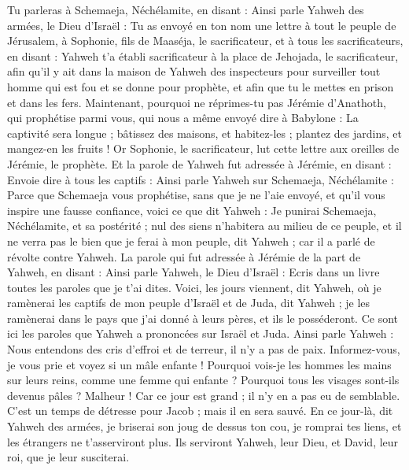 \begin{multicols}{2}
Tu parleras à Schemaeja, Néchélamite, en disant :
Ainsi parle Yahweh des armées, le Dieu d'Israël : Tu as envoyé en ton nom une lettre à tout le peuple de Jérusalem, à Sophonie, fils de Maaséja, le sacrificateur, et à tous les sacrificateurs, en disant :
Yahweh t'a établi sacrificateur à la place de Jehojada, le sacrificateur, afin qu’il y ait dans la maison de Yahweh des inspecteurs pour surveiller tout homme qui est fou et se donne pour prophète, et afin que tu le mettes en prison et dans les fers.
Maintenant, pourquoi ne réprimes-tu pas Jérémie d’Anathoth, qui prophétise parmi vous,
qui nous a même envoyé dire à Babylone : La captivité sera longue ; bâtissez des maisons, et habitez-les ; plantez des jardins, et mangez-en les fruits !
Or Sophonie, le sacrificateur, lut cette lettre aux oreilles de Jérémie, le prophète.
Et la parole de Yahweh fut adressée à Jérémie, en disant :
Envoie dire à tous les captifs : Ainsi parle Yahweh sur Schemaeja, Néchélamite : Parce que Schemaeja vous prophétise, sans que je ne l'aie envoyé, et qu’il vous inspire une fausse confiance,
voici ce que dit Yahweh : Je punirai Schemaeja, Néchélamite, et sa postérité ; nul des siens n’habitera au milieu de ce peuple, et il ne verra pas le bien que je ferai à mon peuple, dit Yahweh ; car il a parlé de révolte contre Yahweh.
\VerseOne{}La parole qui fut adressée à Jérémie de la part de Yahweh, en disant :
Ainsi parle Yahweh, le Dieu d'Israël : Ecris dans un livre toutes les paroles que je t'ai dites.
Voici, les jours viennent, dit Yahweh, où je ramènerai les captifs de mon peuple d'Israël et de Juda, dit Yahweh ; je les ramènerai dans le  pays que j'ai donné à leurs pères, et ils le posséderont.
Ce sont ici les paroles que Yahweh a prononcées sur Israël et Juda.
Ainsi parle Yahweh : Nous entendons des cris d’effroi et de terreur, il n'y a pas de paix.
Informez-vous, je vous prie et voyez si un mâle enfante ! Pourquoi vois-je les hommes les mains sur leurs reins, comme une femme qui enfante ? Pourquoi tous les visages sont-ils devenus pâles ?
Malheur ! Car ce jour est grand ; il n'y en a pas eu de semblable. C'est un temps de détresse pour Jacob ; mais il en sera sauvé.
En ce jour-là, dit Yahweh des armées, je briserai son joug de dessus ton cou, je romprai tes liens, et les étrangers ne t'asserviront plus.
Ils serviront Yahweh, leur Dieu, et David, leur roi, que je leur susciterai.

\end{multicols}

